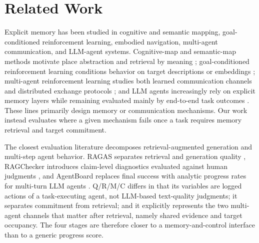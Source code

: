\documentclass{article}
\begin{document}
\section{Related Work}

Explicit memory has been studied in cognitive and semantic mapping, goal-conditioned reinforcement learning, embodied navigation, multi-agent communication, and LLM-agent systems. Cognitive-map and semantic-map methods motivate place abstraction and retrieval by meaning \citep{tolman1948cognitive,gupta2017cognitive,savinov2018semi}; goal-conditioned reinforcement learning conditions behavior on target descriptions or embeddings \citep{andrychowicz2017hindsight}; multi-agent reinforcement learning studies both learned communication channels \citep{sukhbaatar2016commnet,foerster2018ctde} and distributed exchange protocols \citep{boyd2006gossip}; and LLM agents increasingly rely on explicit memory layers while remaining evaluated mainly by end-to-end task outcomes \citep{wang2023voyager,shinn2023reflexion,packer2023memgpt,park2023generative,wu2023autogen}. These lines primarily design memory or communication mechanisms. Our work instead evaluates where a given mechanism fails once a task requires memory retrieval and target commitment.

The closest evaluation literature decomposes retrieval-augmented generation and multi-step agent behavior. RAGAS separates retrieval and generation quality \citep{es2024ragas}, RAGChecker introduces claim-level diagnostics evaluated against human judgments \citep{ru2024ragchecker}, and AgentBoard replaces final success with analytic progress rates for multi-turn LLM agents \citep{ma2024agentboard}. Q/R/M/C differs in that its variables are logged actions of a task-executing agent, not LLM-based text-quality judgments; it separates commitment from retrieval; and it explicitly represents the two multi-agent channels that matter after retrieval, namely shared evidence and target occupancy. The four stages are therefore closer to a memory-and-control interface than to a generic progress score.
\end{document}

